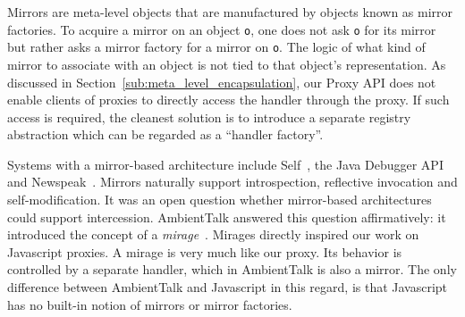\documentclass{sig-alternate}
\begin{document}
Mirrors are meta-level objects that are manufactured by objects known as mirror factories. To acquire a mirror on an object \texttt{o}, one does not ask \texttt{o} for its mirror but rather asks a mirror factory for a mirror on \texttt{o}. The logic of what kind of mirror to associate with an object is not tied to that object's representation. As discussed in Section~\ref{sub:meta_level_encapsulation}, our Proxy API does not enable clients of proxies to directly access the handler through the proxy. If such access is required, the cleanest solution is to introduce a separate registry abstraction which can be regarded as a ``handler factory''.

Systems with a mirror-based architecture include Self~\cite{ungar87power}, the Java Debugger API and Newspeak~\cite{bracha10newspeak}. Mirrors naturally support introspection, reflective invocation and self-modification. It was an open question whether mirror-based architectures could support intercession. AmbientTalk answered this question affirmatively: it introduced the concept of a \emph{mirage}~\cite{mostinckx07behavioral,mostinckx09mirrors}. Mirages directly inspired our work on Javascript proxies. A mirage is very much like our proxy. Its behavior is controlled by a separate handler, which in AmbientTalk is also a mirror. The only difference between AmbientTalk and Javascript in this regard, is that Javascript has no built-in notion of mirrors or mirror factories.




\end{document}
